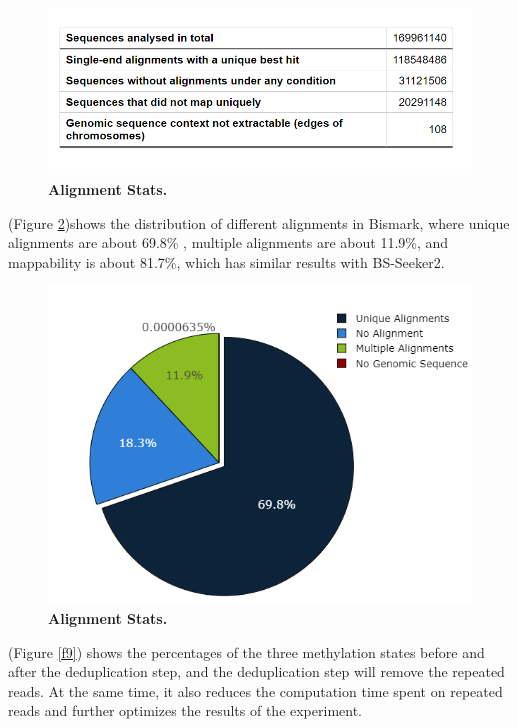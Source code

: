 \documentclass{PHlab-thesis}
\begin{document}
\begin{figure}[h]
  \centering
  \includegraphics[scale=0.8]{table/table_alignment_Stats.png}
  \caption{\textbf{Alignment Stats.}
  }
  \label{f7}
\end{figure}

\par
(Figure \ref{f8})shows the distribution of different alignments in Bismark, where unique alignments are about 69.8\% , multiple alignments are about 11.9\%, and mappability is about 81.7\%, which has similar results with BS-Seeker2.

\begin{figure}[h]
  \centering
  \includegraphics[scale=0.4]{figures/align_fig.png}
  \caption{\textbf{Alignment Stats.}
  }
  \label{f8}
\end{figure}

\par
(Figure \ref{f9}) shows the percentages of the three methylation states before and after the deduplication step, and the deduplication step will remove the repeated reads. At the same time, it also reduces the computation time spent on repeated reads and further optimizes the results of the experiment.
\end{document}
